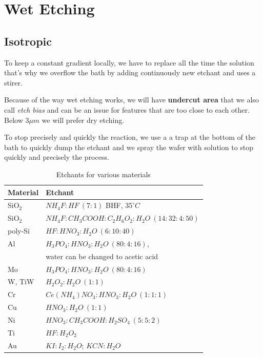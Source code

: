 \documentclass{report}
\begin{document}
\section{Wet Etching}

\subsection{Isotropic}

To keep a constant gradient locally, we have to replace all the time the solution that's why we overflow the bath by adding continuously new etchant and uses a stirer.

Because of the way wet etching works, we will have \textbf{undercut area} that we also call \textit{etch bias} and can be an issue for features that are too close to each other. Below $3 \mu m$ we will prefer dry etching.

To stop precisely and quickly the reaction, we use a a trap at the bottom of the bath to quickly dump the etchant and we spray the wafer with solution to stop quickly and precisely the process.

\begin{table}[hbt]
\centering
\renewcommand{\arraystretch}{1.2}
\begin{tabular}{|l|l|}
\hline
\textbf{Material} & \textbf{Etchant} \\
\hline
SiO$_2$ & $NH_4F:HF \ (7:1)$ BHF, $35^\circ C$ \\
\hline
SiO$_2$ & ${NH_4F:CH_3COOH:C_2H_6O_2:H_2O} \ (14:32:4:50)$ \\
\hline
poly-Si & ${HF:HNO_3:H_2O} \ (6:10:40)$ \\
\hline
Al & ${H_3PO_4:HNO_3:H_2O} \ (80:4:16)$, \\
   & water can be changed to acetic acid \\
\hline
Mo & ${H_3PO_4:HNO_3:H_2O} \ (80:4:16)$ \\
\hline
W, TiW & ${H_2O_2:H_2O} \ (1:1)$ \\
\hline
Cr & ${Ce(NH_4)NO_3:HNO_3:H_2O} \ (1:1:1)$ \\
\hline
Cu & ${HNO_3:H_2O} \ (1:1)$ \\
\hline
Ni & ${HNO_3:CH_3COOH:H_2SO_4} \ (5:5:2)$ \\
\hline
Ti & ${HF:H_2O_2}$ \\
\hline
Au & ${KI:I_2:H_2O}$; ${KCN:H_2O}$ \\
\hline
\end{tabular}
\caption{Etchants for various materials}
\end{table}
\end{document}
